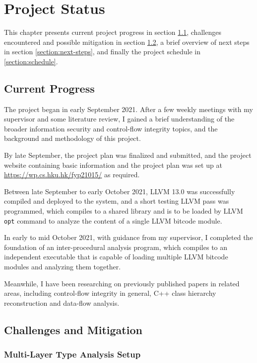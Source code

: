 \chapter{Project Status}
\label{chapter:status}

This chapter presents current project progress in section \ref{section:current-progress}, challenges encountered and possible mitigation in section \ref{section:challenges}, a brief overview of next steps in section \ref{section:next-steps}, and finally the project schedule in \ref{section:schedule}.

\section{Current Progress}
\label{section:current-progress}

The project began in early September 2021. After a few weekly meetings with my supervisor and some literature review, I gained a brief understanding of the broader information security and control-flow integrity topics, and the background and methodology of this project.

By late September, the project plan was finalized and submitted, and the project website containing basic information and the project plan was set up at \url{https://wp.cs.hku.hk/fyp21015/} as required.

Between late September to early October 2021, LLVM 13.0 was successfully compiled and deployed to the system, and a short testing LLVM pass was programmed, which compiles to a shared library and is to be loaded by LLVM \texttt{opt} command to analyze the content of a single LLVM bitcode module.

In early to mid October 2021, with guidance from my supervisor, I completed the foundation of an inter-procedural analysis program, which compiles to an independent executable that is capable of loading multiple LLVM bitcode modules and analyzing them together.

Meanwhile, I have been researching on previously published papers in related areas, including control-flow integrity in general, C++ class hierarchy reconstruction and data-flow analysis.

\section{Challenges and Mitigation}
\label{section:challenges}

\subsection*{Multi-Layer Type Analysis Setup}

